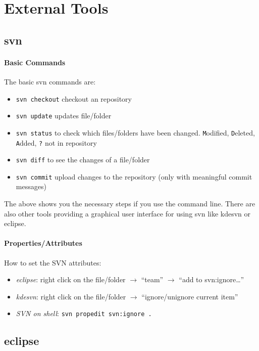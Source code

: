 \section{External Tools}
\subsection{svn}

\paragraph{Basic Commands}
The basic svn commands are:
\begin{itemize}
  \item \texttt{svn checkout} checkout an repository
  \item \texttt{svn update} updates file/folder
  \item \texttt{svn status} to check which files/folders have been changed.
        \texttt{M}odified, \texttt{D}eleted, \texttt{A}dded, \texttt{?} not in repository
  \item \texttt{svn diff} to see the changes of a file/folder
  \item \texttt{svn commit} upload changes to the repository (only with meaningful
        commit messages)
\end{itemize}
The above shows you the necessary steps if you use the command line. There are also other tools providing a graphical 
user interface for using svn like kdesvn or eclipse.

\paragraph{Properties/Attributes}
How to set the SVN attributes:
\begin{itemize}
 \item{\em eclipse}: right click on the file/folder $\rightarrow$ ``team''
        $\rightarrow$ ``add to svn:ignore\dots''
 \item{\em kdesvn}: right click on the file/folder $\rightarrow$ ``ignore/unignore
        current item''
 \item{\em SVN on shell}: \verb+svn propedit svn:ignore .+
\end{itemize}

\subsection{eclipse}
